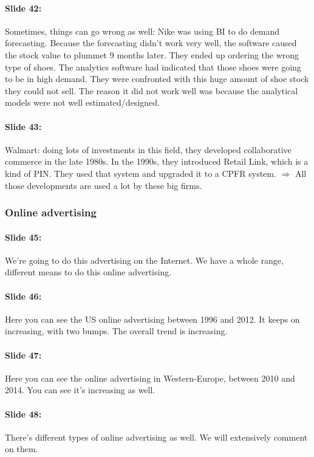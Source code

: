 \documentclass[10pt,a4paper]{report}
\begin{document}
\paragraph{Slide 42:}Sometimes, things can go wrong as well: Nike was using BI to do demand forecasting. Because the forecasting didn't work very well, the software caused the stock value to plummet 9 months later. They ended up ordering the wrong type of shoes. The analytics software had indicated that those shoes were going to be in high demand. They were confronted with this huge amount of shoe stock they could not sell.
The reason it did not work well was because the analytical models were not well estimated/designed.

\paragraph{Slide 43:}Walmart: doing lots of investments in this field, they developed collaborative commerce in the late 1980s. In the 1990s, they introduced Retail Link, which is a kind of PIN. They used that system and upgraded it to a CPFR system. 
$\Rightarrow$ All those developments are used a lot by these big firms.

\subsubsection{Online advertising}

\paragraph{Slide 45:}We're going to do this advertising on the Internet. We have a whole range, different means to do this online advertising.

\paragraph{Slide 46:}Here you can see the US online advertising between 1996 and 2012. It keeps on increasing, with two bumps. The overall trend is increasing.

\paragraph{Slide 47:}Here you can see the online advertising in Western-Europe, between 2010 and 2014. You can see it's increasing as well.

\paragraph{Slide 48:}
There's different types of online advertising as well. We will extensively comment on them.
\end{document}
